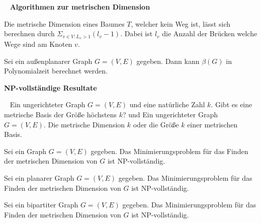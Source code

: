 ~\newline
\textbf{Algorithmen zur metrischen Dimension}
\begin{lem}\cite{landmarks} 
\label{baum}
Die metrische Dimension eines Baumes $T$, welcher kein Weg ist, lässt sich berechnen durch $\Sigma_{v \in V:L_v >1} (l_v-1)$. Dabei ist $l_v$ die Anzahl der Brücken welche Wege sind am Knoten $v$.
\end{lem}
\begin{lem}\cite{aussenplanar}
Sei ein außenplanarer Graph $G=(V,E)$ gegeben. Dann kann $\beta(G)$ in Polynomialzeit berechnet werden.
\end{lem}
\textbf{NP-vollständige Resultate}
\begin{defi}~\newline
\vspace{-7mm}
{Ein ungerichteter Graph $G=(V,E)$ und eine natürliche Zahl $k$.}
{Gibt es eine metrische Basis der Größe höchstens $k$?}
\vspace{-2mm}
\centering und
\newpage
{}
{Ein ungerichteter Graph $G=(V,E)$.}
{Die metrische Dimension $k$ oder die Größe $k$ einer metrischen Basis.}
\end{defi}
\begin{lem}\cite{book} \cite{landmarks}
Sei ein Graph $G=(V,E)$ gegeben. Das Minimierungsproblem für das Finden der metrischen Dimension von $G$ ist NP-vollständig.
\end{lem}
\begin{lem}\cite{aussenplanar}
Sei ein planarer Graph $G=(V,E)$ gegeben. Das Minimierungsproblem für das Finden der metrischen Dimension von $G$ ist NP-vollständig.
\end{lem}
\begin{lem}\cite{bipartitnp}
Sei ein bipartiter Graph $G=(V,E)$ gegeben. Das Minimierungsproblem für das Finden der metrischen Dimension von $G$ ist NP-vollständig.
\end{lem}

